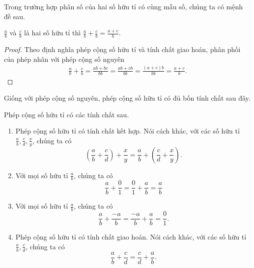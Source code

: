 Trong trường hợp phân số của hai số hữu tỉ có cùng mẫu số, chúng ta có mệnh đề sau.
\begin{theorem}\label{theorem:same-denominator}
	$\frac{a}{b}$ và $\frac{c}{b}$ là hai số hữu tỉ thì $\frac{a}{b} + \frac{c}{b} = \frac{a + c}{b}$.
\end{theorem}

\begin{proof}
	Theo định nghĩa phép cộng số hữu tỉ và tính chất giao hoán, phân phối của phép nhân với phép cộng số nguyên
	\begin{align*}
		\frac{a}{b} + \frac{c}{b} = \frac{ab + bc}{bb} = \frac{ab + cb}{bb} = \frac{(a + c)b}{bb} = \frac{a + c}{b}.
	\end{align*}
\end{proof}

Giống với phép cộng số nguyên, phép cộng số hữu tỉ có đủ bốn tính chất sau đây.
\begin{theorem}\label{theorem:property-of-rational-numbers-addition}
	Phép cộng số hữu tỉ có các tính chất sau.
	\begin{enumerate}[label={(\roman*)}]
		\item Phép cộng số hữu tỉ có tính chất kết hợp. Nói cách khác, với các số hữu tỉ $\frac{a}{b}, \frac{c}{d}, \frac{x}{y}$, chúng ta có
		      \[
			      \left(\frac{a}{b} + \frac{c}{d}\right) + \frac{x}{y} = \frac{a}{b} + \left(\frac{c}{d} + \frac{x}{y}\right).
		      \]
		\item Với mọi số hữu tỉ $\frac{a}{b}$, chúng ta có
		      \[
			      \frac{a}{b} + \frac{0}{1} = \frac{0}{1} + \frac{a}{b} = \frac{a}{b}
		      \]
		\item Với mọi số hữu tỉ $\frac{a}{b}$, chúng ta có
		      \[
			      \frac{a}{b} + \frac{-a}{b} = \frac{-a}{b} + \frac{a}{b} = \frac{0}{1}.
		      \]
		\item Phép cộng số hữu tỉ có tính chất giao hoán. Nói cách khác, với các số hữu tỉ $\frac{a}{b}, \frac{c}{d}$, chúng ta có
		      \[
			      \frac{a}{b} + \frac{c}{d} = \frac{c}{d} + \frac{a}{b}.
		      \]
	\end{enumerate}
\end{theorem}

